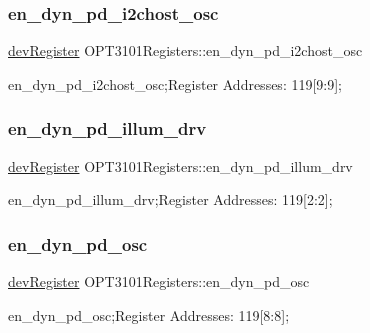 \subsubsection{\texorpdfstring{en\+\_\+dyn\+\_\+pd\+\_\+i2chost\+\_\+osc}{en\_dyn\_pd\_i2chost\_osc}}
{\footnotesize\ttfamily \mbox{\hyperlink{classdev_register}{dev\+Register}} O\+P\+T3101\+Registers\+::en\+\_\+dyn\+\_\+pd\+\_\+i2chost\+\_\+osc}



en\+\_\+dyn\+\_\+pd\+\_\+i2chost\+\_\+osc;Register Addresses\+: 119\mbox{[}9\+:9\mbox{]}; 

\mbox{\label{class_o_p_t3101_registers_a2232f7a08f5802ded8b10f2bd5b63425}} 
\subsubsection{\texorpdfstring{en\+\_\+dyn\+\_\+pd\+\_\+illum\+\_\+drv}{en\_dyn\_pd\_illum\_drv}}
{\footnotesize\ttfamily \mbox{\hyperlink{classdev_register}{dev\+Register}} O\+P\+T3101\+Registers\+::en\+\_\+dyn\+\_\+pd\+\_\+illum\+\_\+drv}



en\+\_\+dyn\+\_\+pd\+\_\+illum\+\_\+drv;Register Addresses\+: 119\mbox{[}2\+:2\mbox{]}; 

\mbox{\label{class_o_p_t3101_registers_a84e49be726f4e0185d74574e0e5125e6}} 
\subsubsection{\texorpdfstring{en\+\_\+dyn\+\_\+pd\+\_\+osc}{en\_dyn\_pd\_osc}}
{\footnotesize\ttfamily \mbox{\hyperlink{classdev_register}{dev\+Register}} O\+P\+T3101\+Registers\+::en\+\_\+dyn\+\_\+pd\+\_\+osc}



en\+\_\+dyn\+\_\+pd\+\_\+osc;Register Addresses\+: 119\mbox{[}8\+:8\mbox{]}; 

